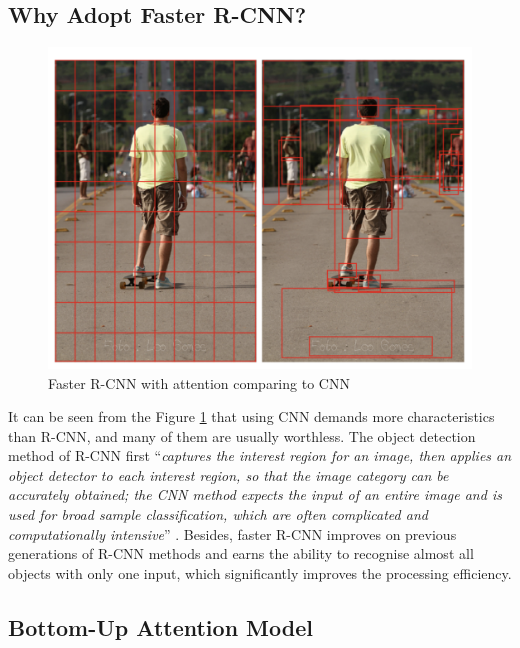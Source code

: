 
\subsection{Why Adopt Faster R-CNN?}

\begin{figure}[h!]
\centering
\includegraphics[width=.6\textwidth]{whyfasterrcnn.pdf}
\caption{Faster R-CNN with attention comparing to CNN \cite{bottomup}}
\label{fig:fasterrcnnbottomup}
\end{figure}

It can be seen from the Figure \ref{fig:fasterrcnnbottomup} that using CNN demands more characteristics than R-CNN, and many of them are usually worthless. The object detection method of R-CNN first ``\textit{captures the interest region for an image, then applies an object detector to each interest region, so that the image category can be accurately obtained; the CNN method expects the input of an entire image and is used for broad sample classification, which are often complicated and computationally intensive}'' \cite{bottomup}. Besides, faster R-CNN improves on previous generations of R-CNN methods and earns the ability to recognise almost all objects with only one input, which significantly improves the processing efficiency.

\subsection{Bottom-Up Attention Model}

